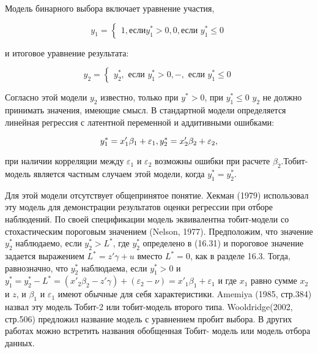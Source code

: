 Модель бинарного выбора включает уравнение участия,

\begin{equation}
y_1=
\begin{cases}
1,  \text{если} y_1^{*}>0,
0,  \text{если } y_1^{*}{\leq}0
\end{cases}
\end{equation}

и итоговое уравнение результата:

\begin{equation}
y_2=
\begin{cases}
y_2^{*},  \text{ если } y_1^{*}>0,
-,  \text{ если }y_1^{*}{\leq}0
\end{cases}
\end{equation}

Согласно этой модели $y_2$ известно, только при $y^{*}>0$, при $y^{*}_{1}{\leq}0$ $y_2$ не должно принимать значения, имеющие смысл. В стандартной модели определяется линейная регрессия с латентной переменной и аддитивными ошибками:

\begin{equation}
y_1^{*}=x'_{1}\beta_1+\varepsilon_1, \\
y_2^{*}=x'_{2}\beta_2+\varepsilon_{2},
\end{equation}

при наличии корреляции между $\varepsilon_1$ и $\varepsilon_2$ возможны ошибки при расчете $\beta_2$.Тобит-модель является частным случаем этой модели, когда $y^{*}_1=y^{*}_2$.

Для этой модели отсутствует общепринятое понятие. Хекман (1979) использовал эту модель для демонстрации результатов оценки регрессии при отборе наблюдений. По своей спецификации модель эквивалентна тобит-модели со стохастическим пороговым значением (Nelson, 1977). Предположим, что значение $y^{*}_2$ наблюдаемо, если $y^{*}_{2}>L^{*}$, где $y^{*}_2$ определено в (16.31) и пороговое значение задается выражением $L^{*}=z'\gamma+u$ вместо $L^{*}=0$, как в разделе 16.3. Тогда, равнозначно, что $y^{*}_2$ наблюдаема, если $y^{*}_1>0$ и $y^{*}_{1}=y^{*}_{2}-L^{*}=(x'_2\beta_{2}-z'\gamma)+(\varepsilon_2-\nu)=x'_{1}\beta_{1}+\varepsilon_1$ и где $x_1$ равно сумме $x_2$ и $z$, и $\beta_1$ и $\varepsilon_1$ имеют обычные для себя характеристики. Amemiya (1985, стр.384) назвал эту модель Тобит-2 или тобит-модель второго типа. Wooldridge(2002, стр.506) предложил название модель с уравнением пробит выбора. В других работах можно встретить названия обобщенная Тобит- модель или модель отбора данных.

